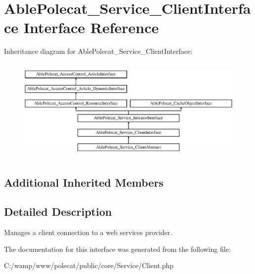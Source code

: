 \hypertarget{interface_able_polecat___service___client_interface}{}\section{Able\+Polecat\+\_\+\+Service\+\_\+\+Client\+Interface Interface Reference}
\label{interface_able_polecat___service___client_interface}
Inheritance diagram for Able\+Polecat\+\_\+\+Service\+\_\+\+Client\+Interface\+:\begin{figure}[H]
\begin{center}
\leavevmode
\includegraphics[height=5.121951cm]{interface_able_polecat___service___client_interface}
\end{center}
\end{figure}
\subsection*{Additional Inherited Members}


\subsection{Detailed Description}
Manages a client connection to a web services provider. 

The documentation for this interface was generated from the following file\+:\begin{DoxyCompactItemize}
\item 
C\+:/wamp/www/polecat/public/core/\+Service/Client.\+php\end{DoxyCompactItemize}
